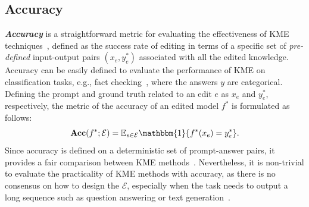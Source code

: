 \documentclass[acmsmall, screen]{acmart}
\begin{document}
\subsection{Accuracy} %
\textit{\textbf{Accuracy}} is a straightforward metric for evaluating the effectiveness of KME techniques~{\cite{KAFT, IKE, MQuAKE, CALINET, ni2023forgetting,mitchell2022fast,cheng2023editing}}, defined as the success rate of editing in terms of a specific set of \textit{pre-defined} input-output pairs $(x_e,y^*_e)$ associated with all the edited knowledge. Accuracy can be easily defined to evaluate the performance of KME on classification tasks, e.g., fact checking~\cite{SERAC,petroni-etal-2021-kilt}, where the answers $y$ are categorical. Defining the prompt and ground truth related to an edit $e$ as $x_e$ and $y^*_e$, respectively, the metric of the accuracy of an edited model $f^*$ is formulated as follows:
\begin{equation}
    \textbf{Acc}(f^*;\mathcal{E})=\mathbb{E}_{e\in\mathcal{E}}\mathbbm{1}\{f^*(x_e)= y^*_e\}.
\end{equation}
Since accuracy is defined on a deterministic set of prompt-answer pairs, it provides a fair comparison between KME methods~{\cite{dai2022knowledge,
    meng2022locating,
    meng2023mass}}. Nevertheless, it is non-trivial to evaluate the practicality of KME methods with accuracy, as there is no consensus on how to design the $\mathcal{E}$, especially when the task needs to output a long sequence such as question answering or text generation~{\cite{meng2022locating, CALINET,meng2023mass}}.
\end{document}
